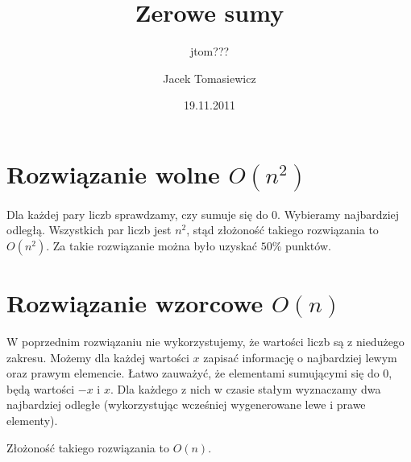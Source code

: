\documentclass[zad, zawodnik, utf8]{sinol}
\newcounter{def}
\newcounter{tw}
\newcounter{lem}
\newcounter{wn}
\newcounter{obs}
\begin{document}
 \signature{jtom???}
  \pagestyle{fancy}
  \title{Zerowe sumy}
  \author{Jacek Tomasiewicz}
  \date{19.11.2011}



\begin{tasktext}%

\setcounter{def}{1}
\setcounter{tw}{1}
\setcounter{wn}{1}
\setcounter{obs}{1}

\section{Rozwiązanie wolne $O(n^2)$}

Dla każdej pary liczb sprawdzamy, czy sumuje się do 0. Wybieramy najbardziej odległą. Wszystkich par liczb jest $n^2$, stąd złożoność takiego rozwiązania to $O(n^2)$. Za takie rozwiązanie można było uzyskać $50\%$ punktów.

\section{Rozwiązanie wzorcowe $O(n)$}

W poprzednim rozwiązaniu nie wykorzystujemy, że wartości liczb są z niedużego zakresu. Możemy dla każdej wartości $x$ zapisać informację o najbardziej lewym oraz prawym elemencie. Łatwo zauważyć, że elementami sumującymi się do 0, będą wartości $-x$ i $x$. Dla każdego z nich w czasie stałym wyznaczamy dwa najbardziej odległe (wykorzystując wcześniej wygenerowane lewe i prawe elementy).

Złożoność takiego rozwiązania to $O(n)$.

\end{tasktext}
\end{document}
